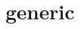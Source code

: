 \documentclass[../main.tex]{subfiles}
\begin{document}
\section{generic}
\label{sec:generic}
\end{document}

